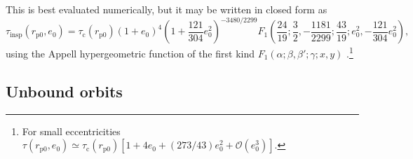 \documentclass[useAMS,usedcolumn,usegraphicx,usenatbib]{mn2e}
\newcommand{\sub}[1]{\ensuremath{_\mathrm{#1}}}
\newcommand{\order}[1]{\ensuremath{\mathcal{O}({#1})}}
\begin{document}
\begin{onecolumn}
\begin{equation}
\end{equation}
This is best evaluated numerically, but it may be written in closed form as
\begin{equation}
\tau\sub{insp}(r\sub{p0},e_0) = \tau\sub{c}(r\sub{p0})(1 + e_0)^4\left(1 + \frac{121}{304}e_0^2\right)^{-3480/2299} F_1\left(\frac{24}{19};\frac{3}{2},-\frac{1181}{2299};\frac{43}{19};e_0^2,-\frac{121}{304}e_0^2\right),
\label{eq:Bound_inspiral}
\end{equation}
using the Appell hypergeometric function of the first kind $F_1(\alpha;\beta,\beta';\gamma;x,y)$ \citep[16.15.1]{Olver2010}.\footnote{For small eccentricities $\tau(r\sub{p0},e_0) \simeq \tau\sub{c}(r\sub{p0})[1 + 4e_0 + (273/43)e_0^2 + \order{e_0^3}]$.}

\subsection{Unbound orbits}\label{sec:Unbound}


\end{onecolumn}
\end{document}
